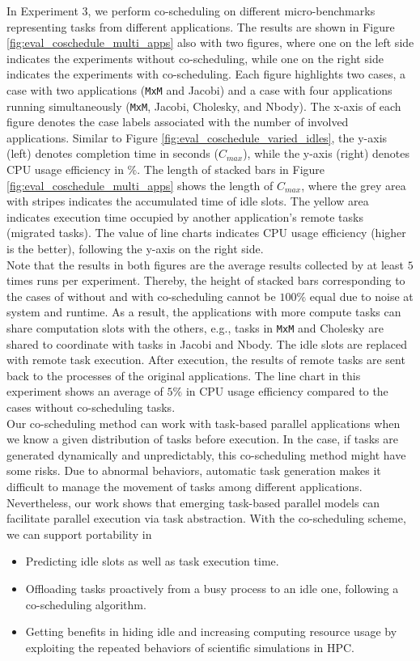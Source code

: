 In Experiment 3, we perform co-scheduling on different micro-benchmarks representing tasks from different applications. The results are shown in Figure \ref{fig:eval_coschedule_multi_apps} also with two figures, where one on the left side indicates the experiments without co-scheduling, while one on the right side indicates the experiments with co-scheduling. Each figure highlights two cases, a case with two applications (\texttt{MxM} and Jacobi) and a case with four applications running simultaneously (\texttt{MxM}, Jacobi, Cholesky, and Nbody). The x-axis of each figure denotes the case labels associated with the number of involved applications. Similar to Figure \ref{fig:eval_coschedule_varied_idles}, the y-axis (left) denotes completion time in seconds ($C_{max}$), while the y-axis (right) denotes CPU usage efficiency in $\%$. The length of stacked bars in Figure \ref{fig:eval_coschedule_multi_apps} shows the length of $C_{max}$, where the grey area with stripes indicates the accumulated time of idle slots. The yellow area indicates execution time occupied by another application's remote tasks (migrated tasks). The value of line charts indicates CPU usage efficiency (higher is the better), following the y-axis on the right side. \\

Note that the results in both figures are the average results collected by at least $5$ times runs per experiment. Thereby, the height of stacked bars corresponding to the cases of without and with co-scheduling cannot be $100\%$ equal due to noise at system and runtime. As a result, the applications with more compute tasks can share computation slots with the others, e.g., tasks in \texttt{MxM} and Cholesky are shared to coordinate with tasks in Jacobi and Nbody. The idle slots are replaced with remote task execution. After execution, the results of remote tasks are sent back to the processes of the original applications. The line chart in this experiment shows an average of $5\%$ in CPU usage efficiency compared to the cases without co-scheduling tasks.\\

Our co-scheduling method can work with task-based parallel applications when we know a given distribution of tasks before execution. In the case, if tasks are generated dynamically and unpredictably, this co-scheduling method might have some risks. Due to abnormal behaviors, automatic task generation makes it difficult to manage the movement of tasks among different applications. Nevertheless, our work shows that emerging task-based parallel models can facilitate parallel execution via task abstraction. With the co-scheduling scheme, we can support portability in
\begin{itemize}
	\item Predicting idle slots as well as task execution time.
	\item Offloading tasks proactively from a busy process to an idle one, following a co-scheduling algorithm.
	\item Getting benefits in hiding idle and increasing computing resource usage by exploiting the repeated behaviors of scientific simulations in HPC.
\end{itemize}

